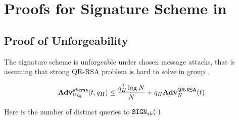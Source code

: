 

\section{Proofs for Signature Scheme in }
\label{sec:proof:sig_scheme}
\subsection{Proof of Unforgeability}
\label{app:proof_unforge}
 
\begin{theorem}
	\label{thm:unforge}
	The signature scheme \sigScheme is unforgeable under chosen message attacks, that is assuming that 
	strong QR-RSA problem is hard to solve in group \qrGroup. 		

	\[
	\mathbf{Adv}^{\scriptsize\textsf{uf-cma}}_{\Pi_{\mathsf{Sig}} }(t, q_H) \le \frac{q_H^2 \log N}{N} + q_H \mathbf{Adv}^{\textsf{QR-RSA}}_{N}(t) 
	\]
	
        Here \oracleQueries is the number of distinct queries to $\signingAlg[\privKey](\cdot)$
	
\end{theorem}

